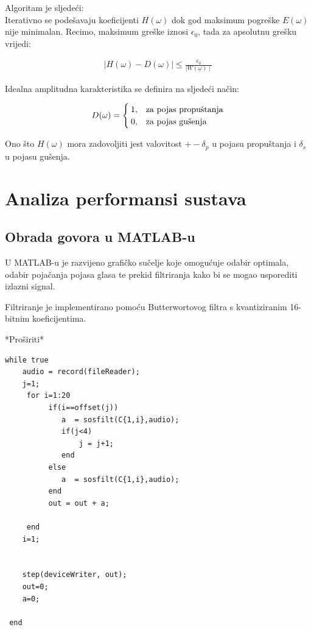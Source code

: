 \documentclass[times, utf8, diplomski]{fer}
\begin{document}
Algoritam je sljedeći: \\
Iterativno se podešavaju koeficijenti $H(\omega)$ dok god maksimum pogreške $E(\omega)$ nije minimalan. Recimo,  maksimum greške iznosi $\epsilon_{0}$, tada za apsolutnu grešku vrijedi:

\begin{equation}
\begin{aligned}
\mid H(\omega) - D(\omega) \mid \leq \frac{\epsilon_{0}}{\mid W(\omega) \mid}
\end{aligned}
\end{equation}

Idealna amplitudna karakteristika se definira na sljedeći način:

\begin{equation}
\begin{aligned}
D(\omega) =
\begin{cases}
  1, &$za pojas propuštanja$\\
  0, & $za pojas gušenja$ 
  \end{cases}
\end{aligned}
\end{equation}

Ono što $H(\omega)$ mora zadovoljiti jest valovitost $+-\delta_{p}$ u pojasu propuštanja i $\delta_{s}$ u pojasu gušenja.

\chapter{Analiza performansi sustava}
\section{Obrada govora u MATLAB-u}
U MATLAB-u je razvijeno grafičko sučelje koje omogućuje odabir optimala, odabir pojačanja pojasa glasa te prekid filtriranja kako bi se mogao usporediti izlazni signal.

Filtriranje je implementirano pomoću Butterwortovog filtra s kvantiziranim 16-bitnim koeficijentima.

*Proširiti*

\begin{lstlisting} 
while true
    audio = record(fileReader);
    j=1;
     for i=1:20
          if(i==offset(j))
             a  = sosfilt(C{1,i},audio); 
             if(j<4)
                 j = j+1;
             end
          else
             a  = sosfilt(C{1,i},audio);
          end
          out = out + a;

     end
    i=1;

    
    step(deviceWriter, out);
    out=0;
    a=0;

 end
\end{lstlisting}
\end{document}
